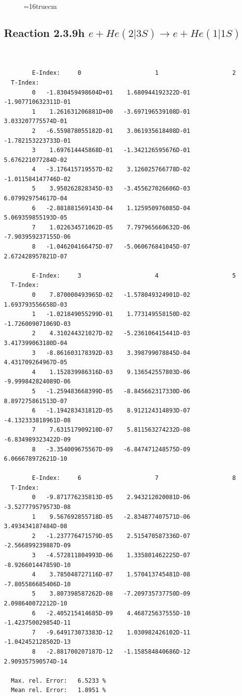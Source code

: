 \documentclass[12pt,dvips]{article}
\begin{document}
\begin{figure} \label{2.3.9g}
\epsfxsize=16truecm
\end{figure}
\newpage

\subsection{
Reaction 2.3.9h  $e + He(2|3S) \rightarrow e + He(1|1S) $
}


\begin{small}\begin{verbatim}


        E-Index:     0                     1                     2
  T-Index:
        0   -1.830459498604D+01    1.680944192322D-01   -1.907710632311D-01
        1    1.261631206881D+00   -3.697196539108D-01    3.033207775574D-01
        2   -6.559878055182D-01    3.061935618408D-01   -1.782153223733D-01
        3    1.697614445868D-01   -1.342126595676D-01    5.676221077284D-02
        4   -3.176415719557D-02    3.126025766778D-02   -1.011584147746D-02
        5    3.950262828345D-03   -3.455627026606D-03    6.079929754617D-04
        6   -2.881881569143D-04    1.125950976085D-04    5.069359855193D-05
        7    1.022634571062D-05    7.797965660632D-06   -7.903959237155D-06
        8   -1.046204166475D-07   -5.060676841045D-07    2.672428957821D-07

        E-Index:     3                     4                     5
  T-Index:
        0    7.870000493965D-02   -1.578049324901D-02    1.693793556658D-03
        1   -1.021849055299D-01    1.773149558150D-02   -1.726009071069D-03
        2    4.310244321027D-02   -5.236106415441D-03    3.417399063180D-04
        3   -8.861603178392D-03    3.398799078845D-04    4.431709264967D-05
        4    1.152839986316D-03    9.136542557803D-06   -9.999842824089D-06
        5   -1.259483668399D-05   -8.845662317330D-06    8.897275861513D-07
        6   -1.194283431812D-05    8.912124314893D-07   -4.132333818961D-08
        7    7.631517909210D-07    5.811563274232D-08   -6.834989323422D-09
        8   -3.354009675567D-09   -6.847471248575D-09    6.066678972621D-10

        E-Index:     6                     7                     8
  T-Index:
        0   -9.871776235813D-05    2.943212020081D-06   -3.527779579573D-08
        1    9.567692855718D-05   -2.834877407571D-06    3.493434187484D-08
        2   -1.237776471579D-05    2.515470587336D-07   -2.566899239887D-09
        3   -4.572811804993D-06    1.335801462225D-07   -8.926601447859D-10
        4    3.785048727116D-07    1.570413745481D-08   -7.805586685406D-10
        5    3.807398587262D-08   -7.209735737750D-09    2.098640072212D-10
        6   -2.405215414685D-09    4.468725637555D-10   -1.423750029854D-11
        7   -9.649173073383D-12    1.030982426102D-11   -1.042452128502D-13
        8   -2.881700207187D-12   -1.158584840686D-12    2.909357590574D-14

  Max. rel. Error:   6.5233 %
  Mean rel. Error:   1.8951 %

\end{verbatim}\end{small}
\end{document}
